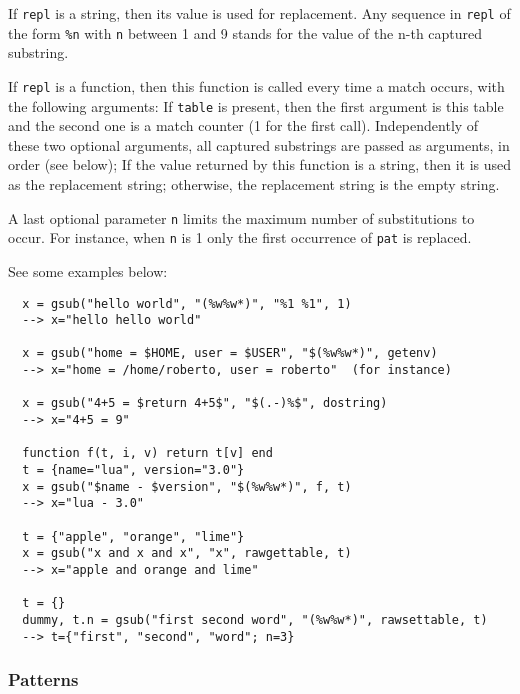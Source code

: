 If \verb|repl| is a string, then its value is used for replacement.
Any sequence in \verb|repl| of the form \verb|%n|
with \verb|n| between 1 and 9
stands for the value of the n-th captured substring.

If \verb|repl| is a function, then this function is called every time a
match occurs, with the following arguments:
If \verb|table| is present, then the first argument is this table
and the second one is a match counter (1 for the first call).
Independently of these two optional arguments,
all captured substrings are passed as arguments,
in order (see below);
If the value returned by this function is a string,
then it is used as the replacement string;
otherwise, the replacement string is the empty string.

A last optional parameter \verb|n| limits
the maximum number of substitutions to occur.
For instance, when \verb|n| is 1 only the first occurrence of
\verb|pat| is replaced.

See some examples below:
\begin{verbatim}
  x = gsub("hello world", "(%w%w*)", "%1 %1", 1)
  --> x="hello hello world"

  x = gsub("home = $HOME, user = $USER", "$(%w%w*)", getenv)
  --> x="home = /home/roberto, user = roberto"  (for instance)

  x = gsub("4+5 = $return 4+5$", "$(.-)%$", dostring)
  --> x="4+5 = 9"

  function f(t, i, v) return t[v] end
  t = {name="lua", version="3.0"}
  x = gsub("$name - $version", "$(%w%w*)", f, t)
  --> x="lua - 3.0"

  t = {"apple", "orange", "lime"}
  x = gsub("x and x and x", "x", rawgettable, t)
  --> x="apple and orange and lime"

  t = {}
  dummy, t.n = gsub("first second word", "(%w%w*)", rawsettable, t)
  --> t={"first", "second", "word"; n=3}
\end{verbatim}


\subsubsection*{Patterns} \label{pm}

